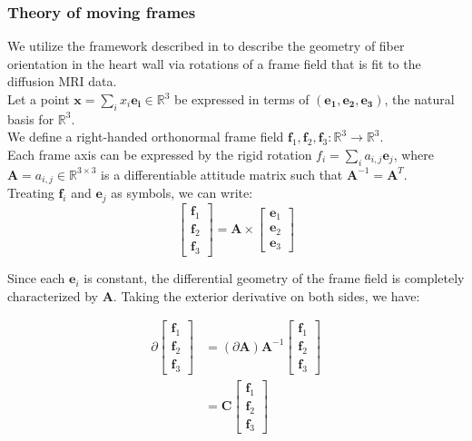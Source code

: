 \subsubsection{Theory of moving frames}

We utilize the framework described in \cite{de1990ventricular} to describe the geometry of fiber orientation in the heart wall via rotations of a frame field that is fit to the diffusion MRI data. \\
Let a point $\mathbf{x} = \sum_i{x_i\mathbf{e_i}} \in \mathbb{R}^3$ be expressed in terms of $(\mathbf{e_1}, \mathbf{e_2}, \mathbf{e_3})$, the natural basis for $\mathbb{R}^3$. \\
We define a right-handed orthonormal frame field $\mathbf{f}_1,\mathbf{f}_2,\mathbf{f}_3 : \mathbb{R}^3 \to \mathbb{R}^3$. \\ 
Each frame axis can be expressed by the rigid rotation $f_i = \sum_i{a_{i,j}\mathbf{e}_j}$, where $\mathbf{A} = {a_{i,j}} \in \mathbb{R}^{3 \times 3}$ is a differentiable attitude matrix such that $\mathbf{A}^{-1} = \mathbf{A}^T$. \\
Treating $\mathbf{f}_i$ and $\mathbf{e}_j$ as symbols, we can write:
\begin{equation}
\begin{bmatrix}
    \mathbf{f}_1 \\
    \mathbf{f}_2 \\
    \mathbf{f}_3
\end{bmatrix} = \mathbf{A} \times \begin{bmatrix}
    \mathbf{e}_1 \\
    \mathbf{e}_2 \\
    \mathbf{e}_3
\end{bmatrix}
\end{equation}

Since each $\mathbf{e}_i$ is constant, the differential geometry of the frame field is completely characterized by $\mathbf{A}$. Taking the exterior derivative on both sides, we have:

\begin{align} \label{eq:1}
    \partial \begin{bmatrix}
                \mathbf{f}_1 \\
                \mathbf{f}_2 \\
                \mathbf{f}_3
            \end{bmatrix} &= (\partial \mathbf{A})\mathbf{A}^{-1}  \begin{bmatrix}
                \mathbf{f}_1 \\
                \mathbf{f}_2 \\
                \mathbf{f}_3
            \end{bmatrix} \\
            &= \mathbf{C}
            \begin{bmatrix}
                \mathbf{f}_1 \\
                \mathbf{f}_2 \\
                \mathbf{f}_3
            \end{bmatrix}
\end{align}

